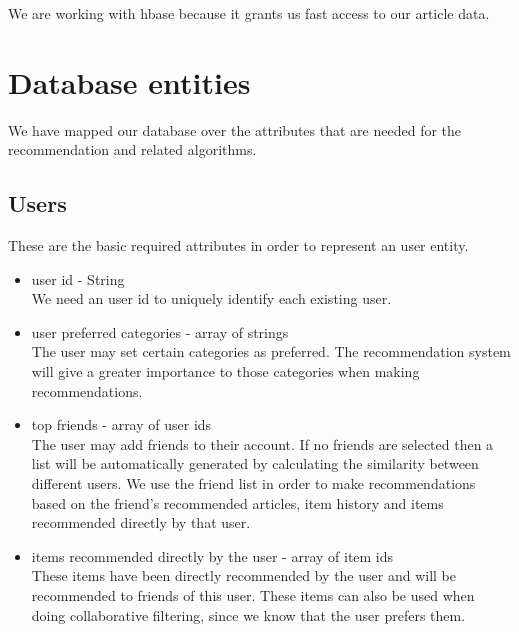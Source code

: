 We are working with hbase because it grants us fast access to our article data.

\section{Database entities}
\label{sec:database-entities}

We have mapped our database over the attributes that are needed for the recommendation and related algorithms.

\subsection{Users}
\label{sec:users}
These are the basic required attributes in order to represent an user entity.
\begin{itemize}
	\item user id - String
		\\ We need an user id to uniquely identify each existing user.
	\item user preferred categories - array of strings
		\\ The user may set certain categories as preferred. 
		The recommendation system will give a greater importance to those categories when making recommendations.
	\item top friends - array of user ids
		\\ The user may add friends to their account. If no friends are selected then a list will be automatically generated by calculating the similarity between different users.
		We use the friend list in order to make recommendations based on the friend's recommended articles, item history and items recommended directly by that user. 
	\item items recommended directly by the user - array of item ids
		\\ These items have been directly recommended by the user and will be recommended to friends of this user.
		These items can also be used when doing collaborative filtering, since we know that the user prefers them.
\end{itemize}

